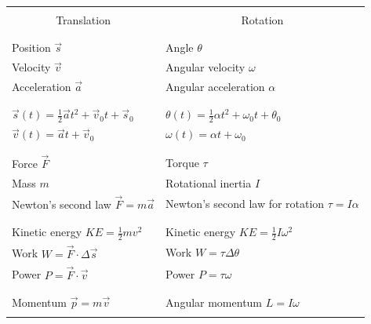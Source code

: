 \begin{landscape}
	\large
	\begin{center}
		\begin{tabular}{| l | l |}
			\hline\hline &  \\
			\multicolumn{1}{|c|}{\huge Translation} & \multicolumn{1}{c|}{\huge Rotation} \\
			& \\
			\hline
			\hline
			& \\
			Position $\vec s$ & Angle $\theta$ \\
			Velocity $\vec v$ & Angular velocity $\omega$ \\
			Acceleration $\vec a$ & Angular acceleration $\alpha$ \\
			& \\
			\hline
			\hline
			& \\
			$\vec s(t)=\frac{1}{2}\vec at^2 + \vec v_0 t + \vec s_0$ & $\theta(t) = \frac{1}{2}\alpha t^2 + \omega_0 t + \theta_0$ \\
			$\vec v(t)= \vec a t + \vec v_0$ & $\omega(t) = \alpha t + \omega_0$ \\

			& \\
			\hline
			\hline
			
			& \\
			Force $\vec F$ & Torque $\tau$ \\
			Mass $m$ & Rotational inertia $I$ \\
			Newton's second law $\vec F = m \vec a$ & Newton's second law for rotation $\tau = I \alpha$ \\
			& \\
			
			\hline
			\hline
			
			& \\
			Kinetic energy $KE=\frac{1}{2}mv^2$ & Kinetic energy $KE=\frac{1}{2}I\omega^2$ \\
			Work $W = \vec F \cdot \Delta \vec s$ & Work $W = \tau \Delta \theta$ \\
			Power $P = \vec F \cdot \vec v$ & Power $P = \tau \omega$ \\
			& \\
			
			\hline
			\hline
			
			& \\
			Momentum $\vec p = m \vec v$ & Angular momentum $L = I\omega$\\
			& \\
			

\end{tabular}
\end{center}
\end{landscape}
